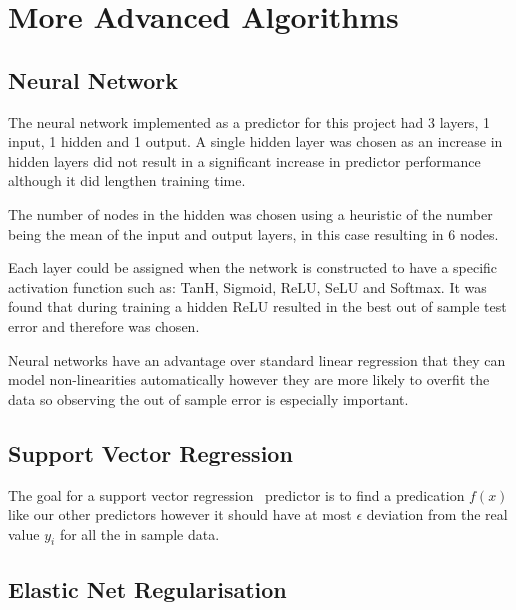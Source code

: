 \documentclass[10pt,twocolumn,letterpaper]{article}
\begin{document}
\section{More Advanced Algorithms}

\subsection{Neural Network}
The neural network implemented as a predictor for this project had 3 layers, 1 input, 1 hidden and 1 output. A single hidden layer was chosen as an increase in hidden layers did not result in a significant increase in predictor performance although it did lengthen training time.

The number of nodes in the hidden was chosen using a heuristic of the number being the mean of the input and output layers, in this case resulting in 6 nodes.

Each layer could be assigned when the network is constructed to have a specific activation function such as: TanH, Sigmoid, ReLU, SeLU and Softmax. It was found that during training a hidden ReLU resulted in the best out of sample test error and therefore was chosen. 

Neural networks have an advantage over standard linear regression that they can model non-linearities automatically however they are more likely to overfit the data so observing the out of sample error is especially important.

\subsection{Support Vector Regression}
The goal for a support vector regression~\cite{Cortes1995} predictor is to find a predication $f(x)$ like our other predictors however it should have at most $\epsilon$ deviation from the real value $y_i$ for all the in sample data.

\subsection{Elastic Net Regularisation}



{\small


}
\end{document}
